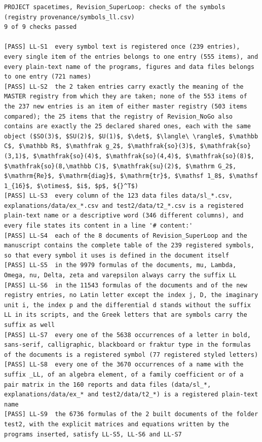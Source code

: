 \documentclass[
  10pt,
]{article}
\begin{document}
\begin{verbatim}
PROJECT spacetimes, Revision_SuperLoop: checks of the symbols (registry provenance/symbols_ll.csv)
9 of 9 checks passed

[PASS] LL-S1  every symbol text is registered once (239 entries), every single item of the entries belongs to one entry (555 items), and every plain-text name of the programs, figures and data files belongs to one entry (721 names)
[PASS] LL-S2  the 2 taken entries carry exactly the meaning of the MASTER registry from which they are taken; none of the 553 items of the 237 new entries is an item of either master registry (503 items compared); the 25 items that the registry of Revision_NoGo also contains are exactly the 25 declared shared ones, each with the same object ($SO(3)$, $SU(2)$, $U(1)$, $\det$, $\langle\ \rangle$, $\mathbb C$, $\mathbb R$, $\mathfrak g_2$, $\mathfrak{so}(3)$, $\mathfrak{so}(3,1)$, $\mathfrak{so}(4)$, $\mathfrak{so}(4,4)$, $\mathfrak{so}(8)$, $\mathfrak{so}(8,\mathbb C)$, $\mathfrak{su}(2)$, $\mathrm G_2$, $\mathrm{Re}$, $\mathrm{diag}$, $\mathrm{tr}$, $\mathsf 1_8$, $\mathsf 1_{16}$, $\otimes$, $i$, $p$, ${}^T$)
[PASS] LL-S3  every column of the 123 data files data/sl_*.csv, explanations/data/ex_*.csv and test2/data/t2_*.csv is a registered plain-text name or a descriptive word (346 different columns), and every file states its content in a line '# content:'
[PASS] LL-S4  each of the 8 documents of Revision_SuperLoop and the manuscript contains the complete table of the 239 registered symbols, so that every symbol it uses is defined in the document itself
[PASS] LL-S5  in the 9979 formulas of the documents, mu, Lambda, Omega, nu, Delta, zeta and varepsilon always carry the suffix LL
[PASS] LL-S6  in the 11543 formulas of the documents and of the new registry entries, no Latin letter except the index j, D, the imaginary unit i, the index p and the differential d stands without the suffix LL in its scripts, and the Greek letters that are symbols carry the suffix as well
[PASS] LL-S7  every one of the 5638 occurrences of a letter in bold, sans-serif, calligraphic, blackboard or fraktur type in the formulas of the documents is a registered symbol (77 registered styled letters)
[PASS] LL-S8  every one of the 3670 occurrences of a name with the suffix _LL, of an algebra element, of a family coefficient or of a pair matrix in the 160 reports and data files (data/sl_*, explanations/data/ex_* and test2/data/t2_*) is a registered plain-text name
[PASS] LL-S9  the 6736 formulas of the 2 built documents of the folder test2, with the explicit matrices and equations written by the programs inserted, satisfy LL-S5, LL-S6 and LL-S7
\end{verbatim}
\end{document}
